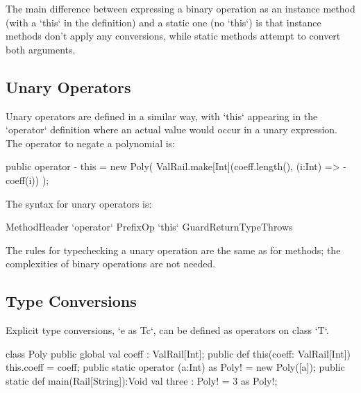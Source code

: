 The main difference between expressing a binary operation as an instance
method (with a \xcd`this` in the definition) and a static one (no \xcd`this`)
is that instance methods don't apply any conversions, while static methods
attempt to convert both arguments. 


\subsection{Unary Operators}

Unary operators are defined in a similar way, with \xcd`this` appearing in the
\xcd`operator` definition where an actual value would occur in a unary
expression.  The operator to negate a polynomial is: 

\begin{xten}
  public operator - this = new Poly(
    ValRail.make[Int](coeff.length(), (i:Int) => -coeff(i))
    );
\end{xten}

The syntax for unary operators is:

\begin{grammar}
MethodHeader \:
  \xcd`operator` PrefixOp \xcd`this`    Guard\opt ReturnType\opt  Throws\opt 
\end{grammar}

The rules for typechecking a unary operation are the same as for methods; the
complexities of binary operations are not needed.



\subsection{Type Conversions}

Explicit type conversions, \xcd`e as T{c}`, can be defined as operators on
class \xcd`T`.

\begin{xten}
class Poly {
  public global val coeff : ValRail[Int];
  public def this(coeff: ValRail[Int]) { this.coeff = coeff;}
  public static operator (a:Int) as Poly! = new Poly([a]);
  public static def main(Rail[String]):Void {
     val three : Poly! = 3 as Poly!;
  }
}
\end{xten}
%



